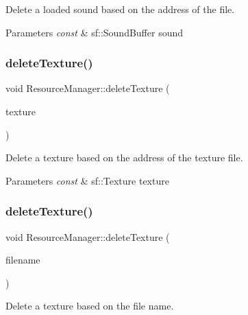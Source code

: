 Delete a loaded sound based on the address of the file. 


\begin{DoxyParams}{Parameters}
{\em const} & sf\+::\+Sound\+Buffer sound \\
\hline
\end{DoxyParams}
\mbox{\label{class_resource_manager_a7c2f6f0c696844f4e425a38d34b06cee}} 
\subsubsection{\texorpdfstring{delete\+Texture()}{deleteTexture()}\hspace{0.1cm}{\footnotesize\ttfamily [1/2]}}
{\footnotesize\ttfamily void Resource\+Manager\+::delete\+Texture (\begin{DoxyParamCaption}\item[{const sf\+::\+Texture \&}]{texture }\end{DoxyParamCaption})}



Delete a texture based on the address of the texture file. 


\begin{DoxyParams}{Parameters}
{\em const} & sf\+::\+Texture texture \\
\hline
\end{DoxyParams}
\mbox{\label{class_resource_manager_a35dd2d508c5170c929b045b8f5b75c10}} 
\subsubsection{\texorpdfstring{delete\+Texture()}{deleteTexture()}\hspace{0.1cm}{\footnotesize\ttfamily [2/2]}}
{\footnotesize\ttfamily void Resource\+Manager\+::delete\+Texture (\begin{DoxyParamCaption}\item[{const std\+::string \&}]{filename }\end{DoxyParamCaption})}



Delete a texture based on the file name. 


